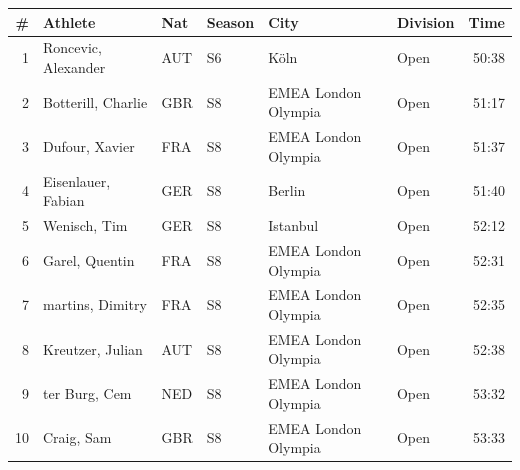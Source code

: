 \begin{tabular}{rlllllr}
\toprule
\multicolumn{1}{r}{\textbf{\#}} & \textbf{Athlete} & \textbf{Nat} & \textbf{Season} & \textbf{City} & \textbf{Division} & \multicolumn{1}{r}{\textbf{Time}} \\
\midrule
1 & Roncevic, Alexander & AUT & S6 & Köln & Open & 50:38 \\
2 & Botterill, Charlie & GBR & S8 & EMEA London Olympia & Open & 51:17 \\
3 & Dufour, Xavier & FRA & S8 & EMEA London Olympia & Open & 51:37 \\
4 & Eisenlauer, Fabian & GER & S8 & Berlin & Open & 51:40 \\
5 & Wenisch, Tim & GER & S8 & Istanbul & Open & 52:12 \\
6 & Garel, Quentin & FRA & S8 & EMEA London Olympia & Open & 52:31 \\
7 & martins, Dimitry & FRA & S8 & EMEA London Olympia & Open & 52:35 \\
8 & Kreutzer, Julian & AUT & S8 & EMEA London Olympia & Open & 52:38 \\
9 & ter Burg, Cem & NED & S8 & EMEA London Olympia & Open & 53:32 \\
10 & Craig, Sam & GBR & S8 & EMEA London Olympia & Open & 53:33 \\
\bottomrule
\end{tabular}